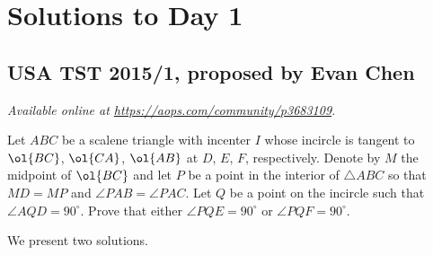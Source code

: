 \documentclass[11pt]{scrartcl}
\begin{document}
\section{Solutions to Day 1}
\subsection{USA TST 2015/1, proposed by Evan Chen}
\textsl{Available online at \url{https://aops.com/community/p3683109}.}
\begin{mdframed}[style=mdpurplebox,frametitle={Problem statement}]
Let $ABC$ be a scalene triangle with incenter $I$ whose incircle is
tangent to $\ol{BC}$, $\ol{CA}$, $\ol{AB}$ at $D$, $E$, $F$,
respectively.  Denote by $M$ the midpoint of $\ol{BC}$ and
let $P$ be a point in the interior of $\triangle ABC$
so that $MD = MP$ and $\angle PAB = \angle PAC$.
Let $Q$ be a point on the incircle such that $\angle AQD = 90^{\circ}$.
Prove that either $\angle PQE = 90^{\circ}$ or $\angle PQF = 90^{\circ}$.
\end{mdframed}
We present two solutions.
\end{document}
